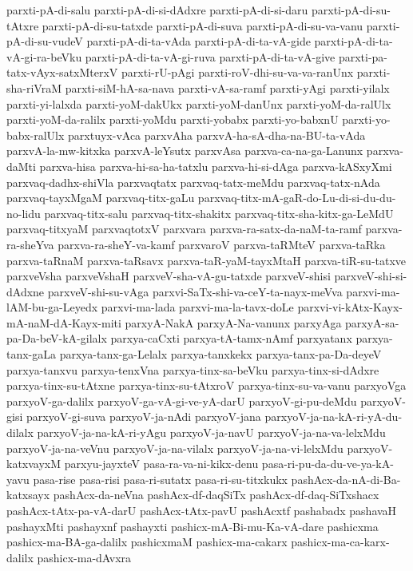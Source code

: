 {parxti-pA-di-salu
parxti-pA-di-si-dAdxre
parxti-pA-di-si-daru
parxti-pA-di-su-tAtxre
parxti-pA-di-su-tatxde
parxti-pA-di-suva
parxti-pA-di-su-va-vanu
parxti-pA-di-su-vudeV
parxti-pA-di-ta-vAda
parxti-pA-di-ta-vA-gide
parxti-pA-di-ta-vA-gi-ra-beVku
parxti-pA-di-ta-vA-gi-ruva
parxti-pA-di-ta-vA-give
parxti-pa-tatx-vAyx-satxMterxV
parxti-rU-pAgi
parxti-roV-dhi-su-va-va-ranUnx
parxti-sha-riVraM
parxti-siM-hA-sa-nava
parxti-vA-sa-ramf
parxti-yAgi
parxti-yilalx
parxti-yi-lalxda
parxti-yoM-dakUkx
parxti-yoM-danUnx
parxti-yoM-da-ralUlx
parxti-yoM-da-ralilx
parxti-yoMdu
parxti-yobabx
parxti-yo-babxnU
parxti-yo-babx-ralUlx
parxtuyx-vAca
parxvAha
parxvA-ha-sA-dha-na-BU-ta-vAda
parxvA-la-mw-kitxka
parxvA-leYsutx
parxvAsa
parxva-ca-na-ga-Lanunx
parxva-daMti
parxva-hisa
parxva-hi-sa-ha-tatxlu
parxva-hi-si-dAga
parxva-kASxyXmi
parxvaq-dadhx-shiVla
parxvaqtatx
parxvaq-tatx-meMdu
parxvaq-tatx-nAda
parxvaq-tayxMgaM
parxvaq-titx-gaLu
parxvaq-titx-mA-gaR-do-Lu-di-si-du-du-no-lidu
parxvaq-titx-salu
parxvaq-titx-shakitx
parxvaq-titx-sha-kitx-ga-LeMdU
parxvaq-titxyaM
parxvaqtotxV
parxvara
parxva-ra-satx-da-naM-ta-ramf
parxva-ra-sheYva
parxva-ra-sheY-va-kamf
parxvaroV
parxva-taRMteV
parxva-taRka
parxva-taRnaM
parxva-taRsavx
parxva-taR-yaM-tayxMtaH
parxva-tiR-su-tatxve
parxveVsha
parxveVshaH
parxveV-sha-vA-gu-tatxde
parxveV-shisi
parxveV-shi-si-dAdxne
parxveV-shi-su-vAga
parxvi-SaTx-shi-va-ceY-ta-nayx-meVva
parxvi-ma-lAM-bu-ga-Leyedx
parxvi-ma-lada
parxvi-ma-la-tavx-doLe
parxvi-vi-kAtx-Kayx-mA-naM-dA-Kayx-miti
parxyA-NakA
parxyA-Na-vanunx
parxyAga
parxyA-sa-pa-Da-beV-kA-gilalx
parxya-caCxti
parxya-tA-tamx-nAmf
parxyatanx
parxya-tanx-gaLa
parxya-tanx-ga-Lelalx
parxya-tanxkekx
parxya-tanx-pa-Da-deyeV
parxya-tanxvu
parxya-tenxVna
parxya-tinx-sa-beVku
parxya-tinx-si-dAdxre
parxya-tinx-su-tAtxne
parxya-tinx-su-tAtxroV
parxya-tinx-su-va-vanu
parxyoVga
parxyoV-ga-dalilx
parxyoV-ga-vA-gi-ve-yA-darU
parxyoV-gi-pu-deMdu
parxyoV-gisi
parxyoV-gi-suva
parxyoV-ja-nAdi
parxyoV-jana
parxyoV-ja-na-kA-ri-yA-du-dilalx
parxyoV-ja-na-kA-ri-yAgu
parxyoV-ja-navU
parxyoV-ja-na-va-lelxMdu
parxyoV-ja-na-veVnu
parxyoV-ja-na-vilalx
parxyoV-ja-na-vi-lelxMdu
parxyoV-katxvayxM
parxyu-jayxteV
pasa-ra-va-ni-kikx-denu
pasa-ri-pu-da-du-ve-ya-kA-yavu
pasa-rise
pasa-risi
pasa-ri-sutatx
pasa-ri-su-titxkukx
pashAcx-da-nA-di-Ba-katxsayx
pashAcx-da-neVna
pashAcx-df-daqSiTx
pashAcx-df-daq-SiTxshacx
pashAcx-tAtx-pa-vA-darU
pashAcx-tAtx-pavU
pashAcxtf
pashabadx
pashavaH
pashayxMti
pashayxnf
pashayxti
pashicx-mA-Bi-mu-Ka-vA-dare
pashicxma
pashicx-ma-BA-ga-dalilx
pashicxmaM
pashicx-ma-cakarx
pashicx-ma-ca-karx-dalilx
pashicx-ma-dAvxra
}
